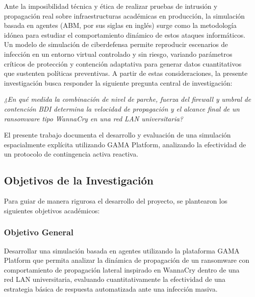 Ante la imposibilidad técnica y ética de realizar pruebas de intrusión y propagación real sobre infraestructuras académicas en producción, la simulación basada en agentes (ABM, por sus siglas en inglés) surge como la metodología idónea para estudiar el comportamiento dinámico de estos ataques informáticos. Un modelo de simulación de ciberdefensa permite reproducir escenarios de infección en un entorno virtual controlado y sin riesgo, variando parámetros críticos de protección y contención adaptativa para generar datos cuantitativos que sustenten políticas preventivas. A partir de estas consideraciones, la presente investigación busca responder la siguiente pregunta central de investigación: 

\begin{center}
    \textit{¿En qué medida la combinación de nivel de parche, fuerza del firewall y umbral de contención BDI determina la velocidad de propagación y el alcance final de un ransomware tipo WannaCry en una red LAN universitaria?}
\end{center}

El presente trabajo documenta el desarrollo y evaluación de una simulación espacialmente explícita utilizando GAMA Platform, analizando la efectividad de un protocolo de contingencia activa reactiva.

\subsection{Objetivos de la Investigación}
Para guiar de manera rigurosa el desarrollo del proyecto, se plantearon los siguientes objetivos académicos:

\subsubsection{Objetivo General}
Desarrollar una simulación basada en agentes utilizando la plataforma GAMA Platform que permita analizar la dinámica de propagación de un ransomware con comportamiento de propagación lateral inspirado en WannaCry dentro de una red LAN universitaria, evaluando cuantitativamente la efectividad de una estrategia básica de respuesta automatizada ante una infección masiva.

